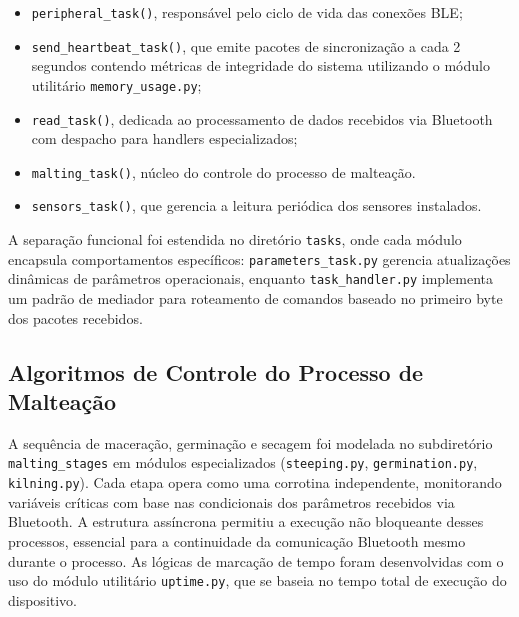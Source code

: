 \begin{itemize}

\item \texttt{peripheral\_task()}, responsável pelo ciclo de vida das conexões BLE;
\item \texttt{send\_heartbeat\_task()}, que emite pacotes de sincronização a cada 2 segundos contendo métricas de integridade do sistema utilizando o módulo utilitário \texttt{memory\_usage.py};
\item \texttt{read\_task()}, dedicada ao processamento de dados recebidos via Bluetooth com despacho para handlers especializados;
\item \texttt{malting\_task()}, núcleo do controle do processo de malteação.
\item \texttt{sensors\_task()}, que gerencia a leitura periódica dos sensores instalados.


\end{itemize}

A separação funcional foi estendida no diretório \texttt{tasks}, onde cada módulo encapsula comportamentos específicos: \texttt{parameters\_task.py} gerencia atualizações dinâmicas de parâmetros operacionais, enquanto \texttt{task\_handler.py} implementa um padrão de mediador para roteamento de comandos baseado no primeiro byte dos pacotes recebidos.

\subsection{Algoritmos de Controle do Processo de Malteação}
A sequência de maceração, germinação e secagem foi modelada no subdiretório \texttt{malting\_stages} em módulos especializados (\texttt{steeping.py}, \texttt{germination.py}, \texttt{kilning.py}). Cada etapa opera como uma corrotina independente, monitorando variáveis críticas com base nas condicionais dos parâmetros recebidos via Bluetooth. A estrutura assíncrona permitiu a execução não bloqueante desses processos, essencial para a continuidade da comunicação Bluetooth mesmo durante o processo. As lógicas de marcação de tempo foram desenvolvidas com o uso do módulo utilitário \texttt{uptime.py}, que se baseia no tempo total de execução do dispositivo.




